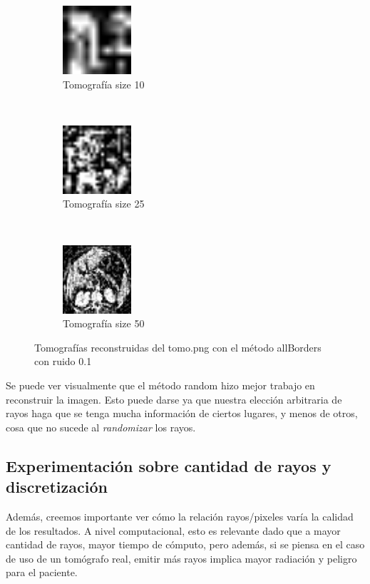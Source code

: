 \begin{figure}[H]
	\centering
    \begin{subfigure}[t]{0.3\textwidth}
        \centering
        \includegraphics[height=1.0in]{img/noise/4.png}
        \caption{Tomografía size 10}
    \end{subfigure}
    ~ 
    \begin{subfigure}[t]{0.3\textwidth}
        \centering
        \includegraphics[height=1.0in]{img/noise/5.png}
        \caption{Tomografía size 25}
	\label{tomo:2}
    \end{subfigure}
    ~ 
    \begin{subfigure}[t]{0.3\textwidth}
        \centering
        \includegraphics[height=1.0in]{img/noise/6.png}
        \caption{Tomografía size 50}
    \end{subfigure}
    \caption{Tomografías reconstruidas del tomo.png con el método allBorders con ruido 0.1}
	\label{fig:resultados-noise2}
\end{figure}

Se puede ver visualmente que el método random hizo mejor trabajo en reconstruir la imagen.
Esto puede darse ya que nuestra elección arbitraria de rayos haga que se tenga mucha información
de ciertos lugares, y menos de otros, cosa que no sucede al \textit{randomizar} los rayos.


\subsection{Experimentación sobre cantidad de rayos y discretización}
\label{sec:exp-rays}
Además, creemos importante ver cómo la relación rayos/pixeles varía la calidad de los resultados.
A nivel computacional, esto es relevante dado que a mayor cantidad de rayos, mayor tiempo de cómputo,
pero además, si se piensa en el caso de uso de un tomógrafo real,
emitir más rayos implica mayor radiación y peligro para el paciente.

